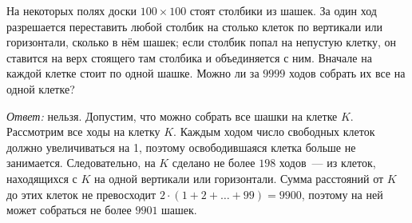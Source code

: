 На некоторых полях доски $100 \times 100$ стоят столбики из шашек.
За один ход разрешается переставить любой столбик на столько клеток по
вертикали или горизонтали, сколько в нём шашек;
если столбик попал на непустую клетку, он ставится на верх стоящего там
столбика и объединяется с ним.
Вначале на каждой клетке стоит по одной шашке.
Можно ли за $9999$ ходов собрать их все на одной клетке?

\solution
\emph{Ответ:} нельзя.
Допустим, что можно собрать все шашки на клетке $K$.
Рассмотрим все ходы на клетку $K$.
Каждым ходом число свободных клеток должно увеличиваться на 1, поэтому
освободившаяся клетка больше не занимается.
Следовательно, на $K$ сделано не более $198$ ходов~--- из клеток, находящихся
с $K$ на одной вертикали или горизонтали.
Сумма расстояний от $K$ до этих клеток не превосходит
$2 \cdot (1 + 2 + \ldots + 99) = 9900$,
поэтому на ней может собраться не более $9901$ шашек.

